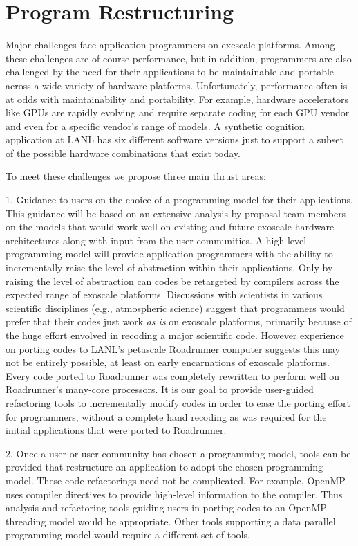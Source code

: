 \section{Program Restructuring}

Major challenges face application programmers on exescale platforms.  Among
these challenges are of course performance, but in addition, programmers are
also challenged by the need for their applications to be maintainable and
portable across a wide variety of hardware platforms.  Unfortunately,
performance often is at odds with maintainability and portability.  For example,
hardware accelerators like GPUs are rapidly evolving and require separate coding
for each GPU vendor and even for a specific vendor's range of models.  A
synthetic cognition application at LANL has six different software versions just
to support a subset of the possible hardware combinations that exist today.

To meet these challenges we propose three main thrust areas:

1. Guidance to users on the choice of a programming model for their
applications.  This guidance will be based on an extensive analysis by proposal
team members on the models that would work well on existing and future exoscale
hardware architectures along with input from the user communities.  A high-level
programming model will provide application programmers with the ability to
incrementally raise the level of abstraction within their applications.  Only by
raising the level of abstraction can codes be retargeted by compilers across the
expected range of exoscale platforms.  Discussions with scientists in various
scientific disciplines (e.g., atmospheric science) suggest that programmers
would prefer that their codes just work \emph{as is} on exoscale platforms,
primarily because of the huge effort envolved in recoding a major scientific
code.  However experience on porting codes to LANL's petascale Roadrunner
computer suggests this may not be entirely possible, at least on early
encarnations of exoscale platforms.  Every code ported to Roadrunner was
completely rewritten to perform well on Roadrunner's many-core processors.  It
is our goal to provide user-guided refactoring tools to incrementally modify
codes in order to ease the porting effort for programmers, without a complete
hand recoding as was required for the initial applications that were ported to
Roadrunner.

2. Once a user or user community has chosen a programming model, tools can be
provided that restructure an application to adopt the chosen programming model.
These code refactorings need not be complicated.  For example, OpenMP uses
compiler directives to provide high-level information to the compiler.  Thus
analysis and refactoring tools guiding users in porting codes to an OpenMP
threading model would be appropriate.  Other tools supporting a data parallel
programming model would require a different set of tools.

